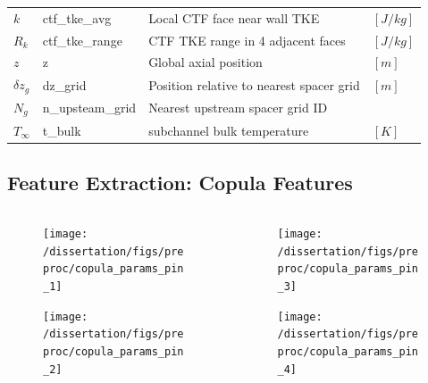 \documentclass[t, pdftex]{beamer}
\begin{document}
\begin{frame}
\begin{table}[h]
\begin{center}
\begin{tabular}[h]{|l | l | l | l |}
            $k$ & ctf\_tke\_avg & Local CTF face near wall TKE &  $[J/kg]$ \\
            $R_k$ & ctf\_tke\_range & CTF TKE range in 4 adjacent faces & $[J/kg]$ \\
            $z$ & z & Global axial position & $[m]$ \\
            $\delta z_g$ & dz\_grid & Position relative to nearest spacer grid & $[m]$ \\
            $N_g$ & n\_upsteam\_grid  & Nearest upstream spacer grid ID &  \\
            $T_\infty$ & t\_bulk & subchannel bulk temperature  &  $[K]$ \\
            \hline
        \end{tabular}
        \label{tab:features}
    \end{center}
\end{table}
\end{frame}

\subsection*{Feature Extraction: Copula Features}
\begin{frame}
\vspace{-34pt}
\begin{columns}
    \begin{column}{0.5\textwidth}
        \begin{figure}[H]%
            \texttt{[image: /dissertation/figs/preproc/copula\_params\_pin\_1]}
        \end{figure}
    \vspace{-26pt}
            \begin{figure}[H]%
                \texttt{[image: /dissertation/figs/preproc/copula\_params\_pin\_2]}
            \end{figure}
    \end{column}
    \begin{column}{0.5\textwidth}
        \begin{figure}[H]%
            \texttt{[image: /dissertation/figs/preproc/copula\_params\_pin\_3]}
        \end{figure}
    \vspace{-26pt}
            \begin{figure}[H]%
                \texttt{[image: /dissertation/figs/preproc/copula\_params\_pin\_4]}
            \end{figure}
\end{column}
\end{columns}
\end{frame}
\end{document}
